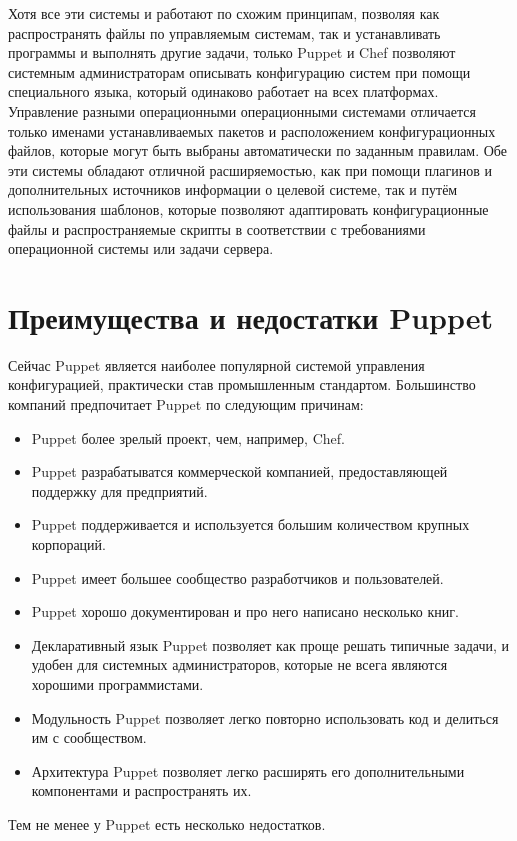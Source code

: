 Хотя все эти системы и работают по схожим принципам, позволяя как распространять файлы по управляемым системам, так и устанавливать программы и выполнять другие задачи, только Puppet и Chef позволяют системным администраторам описывать конфигурацию систем при помощи специального языка, который одинаково работает на всех платформах. Управление разными операционными операционными системами отличается только именами устанавливаемых пакетов и расположением конфигурационных файлов, которые могут быть выбраны автоматически по заданным правилам. Обе эти системы обладают отличной расширяемостью, как при помощи плагинов и дополнительных источников информации о целевой системе, так и путём использования шаблонов, которые позволяют адаптировать конфигурационные файлы и распространяемые скрипты в соответствии с требованиями операционной системы или задачи сервера.

\section{Преимущества и недостатки Puppet}

Сейчас Puppet является наиболее популярной системой управления конфигурацией, практически став промышленным стандартом. Большинство компаний предпочитает Puppet по следующим причинам:

\begin{itemize}
\item Puppet более зрелый проект, чем, например, Chef.
\item Puppet разрабатыватся коммерческой компанией, предоставляющей поддержку для предприятий.
\item Puppet поддерживается и используется большим количеством крупных корпораций.
\item Puppet имеет большее сообщество разработчиков и пользователей.
\item Puppet хорошо документирован и про него написано несколько книг.
\item Декларативный язык Puppet позволяет как проще решать типичные задачи, и удобен для системных администраторов, которые не всега являются хорошими программистами.
\item Модульность Puppet позволяет легко повторно использовать код и делиться им с сообществом.
\item Архитектура Puppet позволяет легко расширять его дополнительными компонентами и распространять их.
\end{itemize}

Тем не менее у Puppet есть несколько недостатков.


